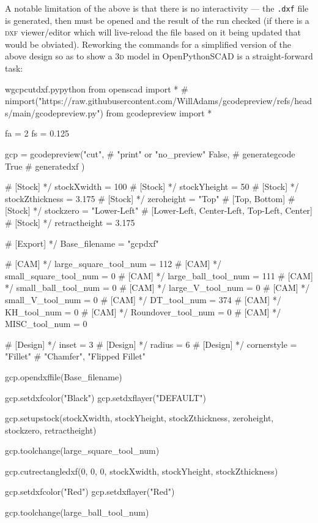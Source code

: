 \documentclass{ltxdoc}
\begin{document}
A notable limitation of the above is that there is no interactivity --- the \verb|.dxf| file is generated, then must be opened and the result of the run checked (if there is a \textsc{dxf} viewer/editor which will live-reload the file based on it being updated that would be obviated). Reworking the commands for a simplified version of the above design so as to show a \textsc{3d} model in OpenPythonSCAD is a straight-forward task:

\lstset{firstnumber=1}%
\begin{writecode}{w}{gcpcutdxf.py}{python}
from openscad import *
# nimport("https://raw.githubusercontent.com/WillAdams/gcodepreview/refs/heads/main/gcodepreview.py")
from gcodepreview import *

fa = 2
fs = 0.125

gcp = gcodepreview("cut", # "print" or "no_preview"
                   False, # generategcode
                   True   # generatedxf
                   )

# [Stock] */
stockXwidth = 100
# [Stock] */
stockYheight = 50
# [Stock] */
stockZthickness = 3.175
# [Stock] */
zeroheight = "Top"  # [Top, Bottom]
# [Stock] */
stockzero = "Lower-Left"  # [Lower-Left, Center-Left, Top-Left, Center]
# [Stock] */
retractheight = 3.175

# [Export] */
Base_filename = "gcpdxf"


# [CAM] */
large_square_tool_num = 112
# [CAM] */
small_square_tool_num = 0
# [CAM] */
large_ball_tool_num = 111
# [CAM] */
small_ball_tool_num = 0
# [CAM] */
large_V_tool_num = 0
# [CAM] */
small_V_tool_num = 0
# [CAM] */
DT_tool_num = 374
# [CAM] */
KH_tool_num = 0
# [CAM] */
Roundover_tool_num = 0
# [CAM] */
MISC_tool_num = 0

# [Design] */
inset = 3
# [Design] */
radius = 6
# [Design] */
cornerstyle = "Fillet"  # "Chamfer", "Flipped Fillet"

gcp.opendxffile(Base_filename)

gcp.setdxfcolor("Black")
gcp.setdxflayer("DEFAULT")

gcp.setupstock(stockXwidth, stockYheight, stockZthickness, zeroheight, stockzero, retractheight)

gcp.toolchange(large_square_tool_num)

gcp.cutrectangledxf(0, 0, 0, stockXwidth, stockYheight, stockZthickness)

gcp.setdxfcolor("Red")
gcp.setdxflayer("Red")

gcp.toolchange(large_ball_tool_num)


\end{writecode}
\end{document}
